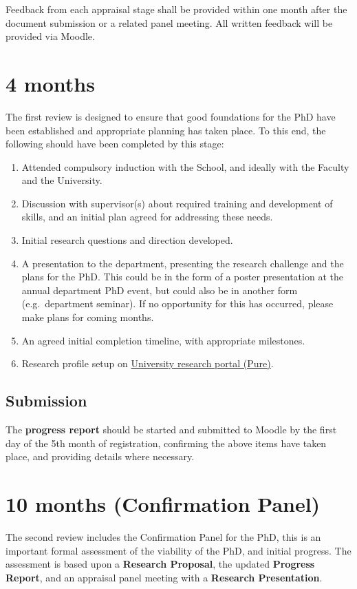 \documentclass[12pt,a4paper]{article}
\begin{document}
Feedback from each appraisal stage shall be provided within one month after the document submission or a related panel meeting. All written feedback will be provided via Moodle.


\section{4 months}
The first review is designed to ensure that good foundations for the PhD have been established and appropriate planning has taken place. To this end, the following should have been completed by this stage:
\begin{enumerate}
\item Attended compulsory induction with the School, and ideally with the Faculty and the University.
\item Discussion with supervisor(s) about required training and development of skills, and an initial plan agreed for addressing these needs.
\item Initial research questions and direction developed.
\item A presentation to the department, presenting the research challenge and the plans for the PhD. This could be in the form of a poster presentation at the annual department PhD event, but could also be in another form (e.g.\ department seminar). If no opportunity for this has occurred, please make plans for coming months.
\item An agreed initial completion timeline, with appropriate milestones.
\item Research profile setup on \href{https://pure.lancs.ac.uk}{University research portal (Pure)}.
\end{enumerate}

\subsection{Submission}
The \textbf{progress report} should be started and submitted to Moodle by the first day of the 5th month of registration, confirming the above items have taken place, and providing details where necessary.


\section{10 months (Confirmation Panel)}
The second review includes the Confirmation Panel for the PhD, this is an important formal assessment of the viability of the PhD, and initial progress. The assessment is based upon a \textbf{Research Proposal}, the updated \textbf{Progress Report}, and an appraisal panel meeting with a \textbf{Research Presentation}.
\end{document}

